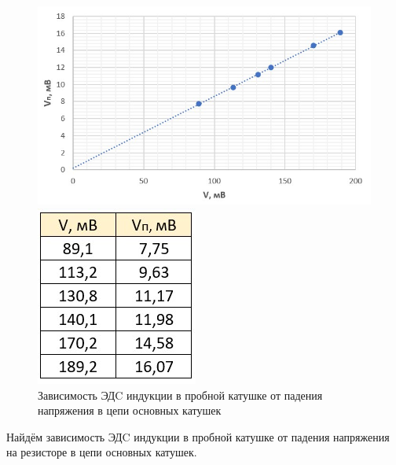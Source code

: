 \documentclass[a4paper,12pt]{article}
\begin{document}
\begin{figure}[h!]
    \begin{center}
        \begin{minipage}{0.75\linewidth}
            \includegraphics[width=\linewidth]{cal.jpg}
            \caption{Зависимость ЭДC индукции в пробной катушке от падения напряжения в цепи основных катушек}
        \end{minipage}
        \hfill
        \begin{minipage}{0.21\linewidth}
            \includegraphics[width=\linewidth]{2020-10-11.jpg}
        \end{minipage}
    \end{center}
\end{figure} 
Найдём зависимость ЭДC индукции в пробной катушке от падения напряжения на резисторе в цепи основных катушек.
\end{document}
